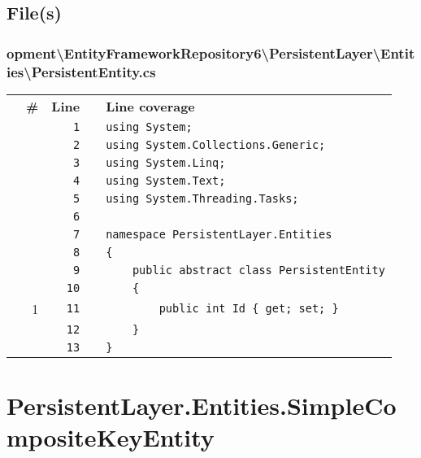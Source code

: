 \documentclass[a4paper,10pt]{article}
\begin{document}
\subsection{File(s)}
\subsubsection{opment\textbackslash EntityFrameworkRepository6\textbackslash PersistentLayer\textbackslash Entities\textbackslash PersistentEntity.cs}
\begin{longtable}[l]{lrrll}
\textbf{} & \textbf{\#} & \textbf{Line} & \textbf{} & \textbf{Line coverage}\\
\cellcolor{gray} &  & \verb~1~ & & \verb~using System;~\\
\cellcolor{gray} &  & \verb~2~ & & \verb~using System.Collections.Generic;~\\
\cellcolor{gray} &  & \verb~3~ & & \verb~using System.Linq;~\\
\cellcolor{gray} &  & \verb~4~ & & \verb~using System.Text;~\\
\cellcolor{gray} &  & \verb~5~ & & \verb~using System.Threading.Tasks;~\\
\cellcolor{gray} &  & \verb~6~ & & \verb~~\\
\cellcolor{gray} &  & \verb~7~ & & \verb~namespace PersistentLayer.Entities~\\
\cellcolor{gray} &  & \verb~8~ & & \verb~{~\\
\cellcolor{gray} &  & \verb~9~ & & \verb~    public abstract class PersistentEntity~\\
\cellcolor{gray} &  & \verb~10~ & & \verb~    {~\\
\cellcolor{green} & 1 & \verb~11~ & & \verb~        public int Id { get; set; }~\\
\cellcolor{gray} &  & \verb~12~ & & \verb~    }~\\
\cellcolor{gray} &  & \verb~13~ & & \verb~}~\\
\end{longtable}
\newpage
\section{PersistentLayer.Entities.SimpleCompositeKeyEntity}
\end{document}
